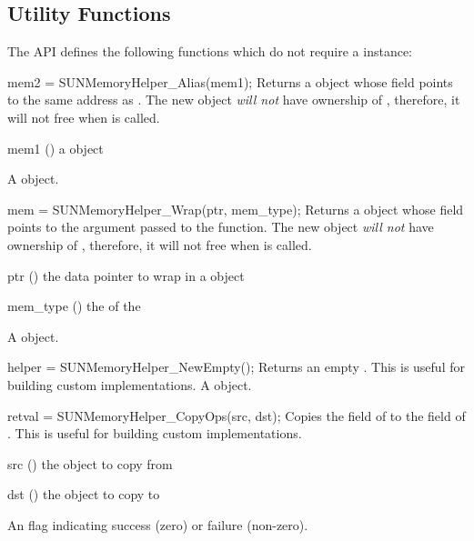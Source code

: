 %
%
\subsection{Utility Functions}

The  API defines the following functions which do not
require a  instance:

{
  mem2 = SUNMemoryHelper\_Alias(mem1);
}
{
  Returns a  object whose  field points to the same address
  as . The new object \textit{will not} have
  ownership of , therefore, it will not free  when
   is called.
}
{
  \begin{args}[mem1]
    \item[mem1] () a  object
  \end{args}
}
{
  A  object.
}
{}

{
  mem = SUNMemoryHelper\_Wrap(ptr, mem\_type);
}
{
  Returns a  object whose  field points to the 
  argument passed to the function. The new object \textit{will not} have
  ownership of , therefore, it will not free  when
   is called.
}
{
  \begin{args}
  \item[ptr] () the data pointer to wrap in a  object
  \item[mem\_type] () the  of the 
  \end{args}
}
{
  A  object.
}
{}

{
  helper = SUNMemoryHelper\_NewEmpty();
}
{
  Returns an empty .
  This is useful for building custom  implementations.
}
{
}
{
  A  object.
}
{}

{
  retval = SUNMemoryHelper\_CopyOps(src, dst);
}
{
  Copies the  field of  to the  field of .
  This is useful for building custom  implementations.
}
{
  \begin{args}[dst]
  \item[src] () the object to copy from
  \item[dst] () the object to copy to
  \end{args}
}
{
  An  flag indicating success (zero) or failure (non-zero).
}
{}


